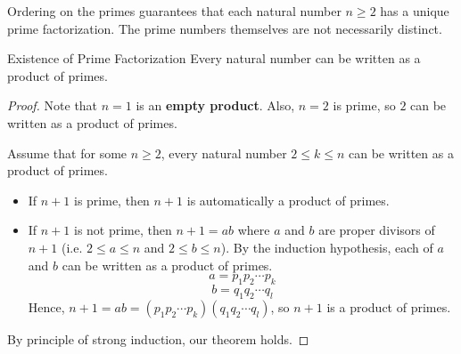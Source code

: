 \documentclass[letterpaper,12pt]{report}
\begin{document}
Ordering on the primes guarantees that each natural number $n \geq 2$ has a unique prime factorization. The prime numbers themselves are not necessarily distinct.

\begin{thmbox}{Existence of Prime Factorization}{}
    Every natural number can be written as a product of primes.
    \tcblower
    \begin{proof}
        Note that $n=1$ is an \textbf{empty product}. Also, $n=2$ is prime, so $2$ can be written as a product of primes.

        Assume that for some $n \geq 2$, every natural number $2 \leq k \leq n$ can be written as a product of primes.
        \begin{itemize}
            \item If $n+1$ is prime, then $n+1$ is automatically a product of primes.
            \item If $n+1$ is not prime, then $n+1 = ab$ where $a$ and $b$ are proper divisors of $n+1$ (i.e. $2 \leq a \leq n$ and $2 \leq b \leq n$). By the induction hypothesis, each of $a$ and $b$ can be written as a product of primes.
            \[a = p_1 p_2 \cdots p_k\]
            \[b = q_1 q_2 \cdots q_l\]
            Hence, $n+1 = ab = (p_1 p_2 \cdots p_k) (q_1 q_2 \cdots q_l)$, so $n+1$ is a product of primes.
        \end{itemize}
        By principle of strong induction, our theorem holds.
    \end{proof}
\end{thmbox}
\end{document}
